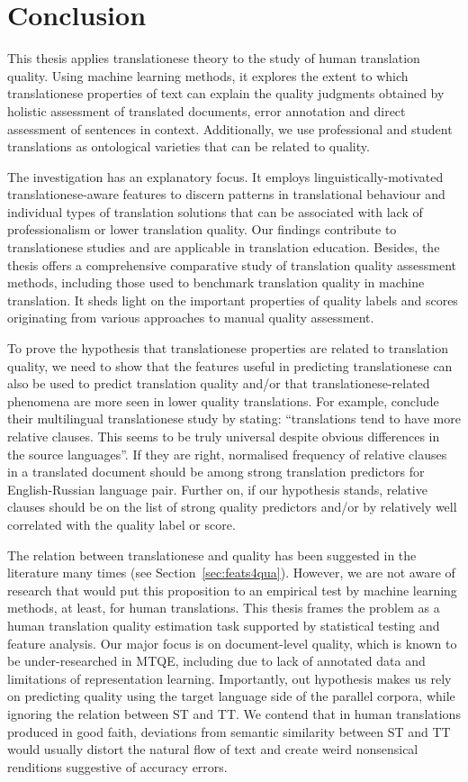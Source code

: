 \chapter{\label{cha:fin}Conclusion}
This thesis applies translationese theory to the study of human translation quality. 
Using machine learning methods, it explores the extent to which translationese properties of text can explain the quality judgments obtained by holistic assessment of translated documents, error annotation and direct assessment of sentences in context. Additionally, we use professional and student translations as ontological varieties that can be related to quality. 

The investigation has an explanatory focus. It employs linguistically-motivated translationese-aware features to discern patterns in translational behaviour and individual types of translation solutions that can be associated with lack of professionalism or lower translation quality. Our findings contribute to translationese studies and are applicable in translation education. 
Besides, the thesis offers a comprehensive comparative study of translation quality assessment methods, including those used to benchmark translation quality in machine translation. It sheds light on the important properties of quality labels and scores originating from various approaches to manual quality assessment. 

To prove the hypothesis that translationese properties are related to translation quality, we need to show that the features useful in predicting translationese can also be used to predict translation quality and/or that translationese-related phenomena are more seen in lower quality translations. For example, \citet[][p.357]{Hu2021} conclude their multilingual translationese study by stating: ``translations tend to have more relative clauses. This seems to be truly universal despite obvious differences in the source languages''. If they are right, normalised frequency of relative clauses in a translated document should be among strong translation predictors for English-Russian language pair. Further on, if our hypothesis stands, relative clauses should be on the list of strong quality predictors and/or by relatively well correlated with the quality label or score. 

The relation between translationese and quality has been suggested in the literature many times (see Section~\ref{sec:feats4qua}). However, we are not aware of research that would put this proposition to an empirical test by machine learning methods, at least, for human translations. This thesis frames the problem as a human translation quality estimation task supported by statistical testing and feature analysis. Our major focus is on document-level quality, which is known to be under-researched in MTQE, including due to lack of annotated data and limitations of representation learning. Importantly, out hypothesis makes us rely on predicting quality using the target language side of the parallel corpora, while ignoring the relation between ST and TT. We contend that in human translations produced in good faith, deviations from semantic similarity between ST and TT would usually distort the natural flow of text and create weird nonsensical renditions suggestive of accuracy errors. 

